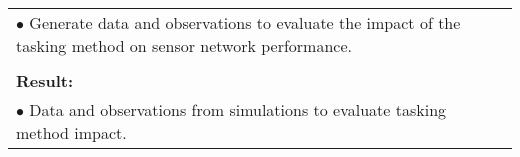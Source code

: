 \begin{table}[!h]
\begin{center}
\begin{tabular}{|p{35mm}||p{55mm}|p{50mm}||p{40mm}|}
      \multicolumn{4}{|p{150mm}|}{$\bullet$ Generate data and observations to evaluate the impact of the tasking method on sensor network performance.} \\
      \multicolumn{4}{|p{150mm}|}{}                                                                                                                                                                           \\
      \multicolumn{4}{|p{150mm}|}{\textbf{Result:}}                                                                                                                                                       \\
      \multicolumn{4}{|p{150mm}|}{$\bullet$ Data and observations from simulations to evaluate tasking method impact.}                                                                                                                          \\
      \hline
    \end{tabular}
  \end{center}
\end{table}

\clearpage

